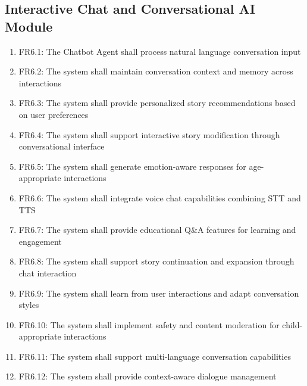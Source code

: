 \subsection{Interactive Chat and Conversational AI Module}
\begin{enumerate}
    \item FR6.1: The Chatbot Agent shall process natural language conversation input
    \item FR6.2: The system shall maintain conversation context and memory across interactions
    \item FR6.3: The system shall provide personalized story recommendations based on user preferences
    \item FR6.4: The system shall support interactive story modification through conversational interface
    \item FR6.5: The system shall generate emotion-aware responses for age-appropriate interactions
    \item FR6.6: The system shall integrate voice chat capabilities combining STT and TTS
    \item FR6.7: The system shall provide educational Q\&A features for learning and engagement
    \item FR6.8: The system shall support story continuation and expansion through chat interaction
    \item FR6.9: The system shall learn from user interactions and adapt conversation styles
    \item FR6.10: The system shall implement safety and content moderation for child-appropriate interactions
    \item FR6.11: The system shall support multi-language conversation capabilities
    \item FR6.12: The system shall provide context-aware dialogue management
\end{enumerate}

